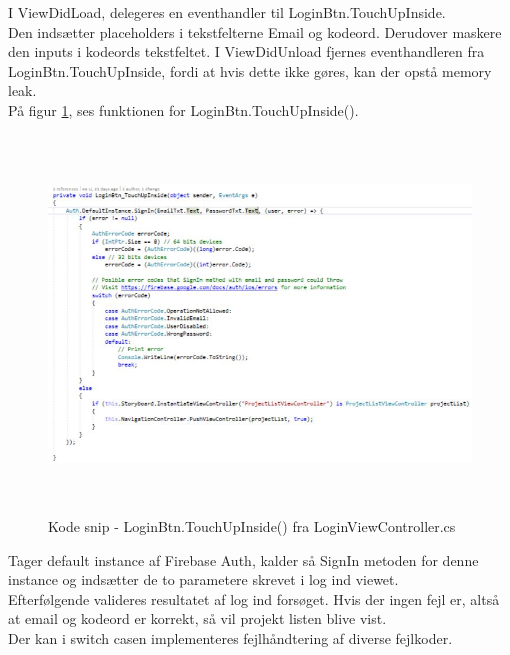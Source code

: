 \clearpage

I ViewDidLoad, delegeres en eventhandler til LoginBtn.TouchUpInside. \\
Den indsætter placeholders i tekstfelterne Email og kodeord. Derudover maskere den inputs i kodeords tekstfeltet.
I ViewDidUnload fjernes eventhandleren fra LoginBtn.TouchUpInside, fordi at hvis dette ikke gøres, kan der opstå memory leak. \\

På figur \ref{fig:LoginBtn}, ses funktionen for LoginBtn.TouchUpInside().
\begin{figure}[H] %
	\centering
	\includegraphics[height=10cm, width=18cm]{../ArkitekturDesign/Design/Login/LoginBtn}
	\caption{Kode snip - LoginBtn.TouchUpInside() fra LoginViewController.cs}
	\label{fig:LoginBtn}
\end{figure}
Tager default instance af Firebase Auth, kalder så SignIn metoden for denne instance og indsætter de to parametere skrevet i log ind viewet. \\
Efterfølgende valideres resultatet af log ind forsøget. Hvis der ingen fejl er, altså at email og kodeord er korrekt, så vil projekt listen blive vist. \\
Der kan i switch casen implementeres fejlhåndtering af diverse fejlkoder. 


\clearpage